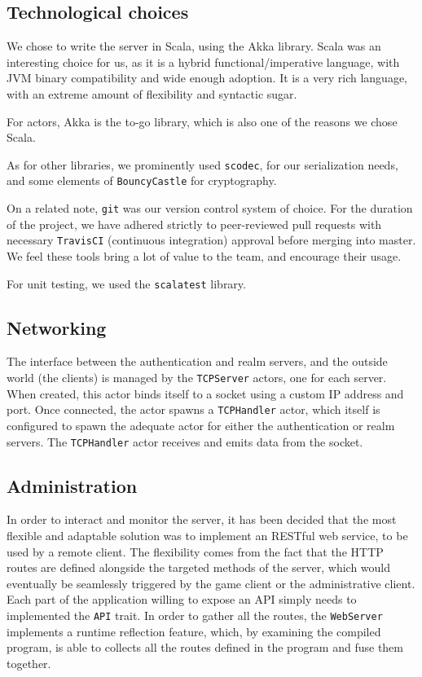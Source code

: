 \documentclass[paper=a4, fontsize=11pt]{scrartcl}
\begin{document}
\subsection{Technological choices}

We chose to write the server in Scala, using the Akka library.
Scala was an interesting choice for us, as it is a hybrid functional/imperative
language, with JVM binary compatibility and wide enough adoption.
It is a very rich language, with an extreme amount of flexibility and syntactic
sugar.

For actors, Akka is the to-go library, which is also one of the reasons we chose
Scala.

As for other libraries, we prominently used \texttt{scodec}, for our
serialization needs, and some elements of \texttt{BouncyCastle} for
cryptography.

On a related note, \texttt{git} was our version control system of choice.
For the duration of the project, we have adhered strictly to peer-reviewed pull
requests with necessary \texttt{TravisCI} (continuous integration) approval
before merging into master.
We feel these tools bring a lot of value to the team, and encourage their usage.

For unit testing, we used the \texttt{scalatest} library.

\subsection{Networking}

The interface between the authentication and realm servers, and the outside
world (the clients) is managed by the \texttt{TCPServer} actors, one for each
server. 
When created, this actor binds itself to a socket using a custom IP address and
port.
Once connected, the actor spawns a \texttt{TCPHandler} actor, which itself is
configured to spawn the adequate actor for either the authentication or realm
servers.
The \texttt{TCPHandler} actor receives and emits data from the socket.


\subsection{Administration}

In order to interact and monitor the server, it has been decided that the most
flexible and adaptable solution was to implement an RESTful web service, to be
used by a remote client.
The flexibility comes from the fact that the HTTP routes are defined alongside
the targeted methods of the server, which would eventually be seamlessly
triggered by the game client or the administrative client.
Each part of the application willing to expose an API simply needs to
implemented the \texttt{API} trait.
In order to gather all the routes, the \texttt{WebServer} implements a
runtime reflection feature, which, by examining the compiled program, is able to
collects all the routes defined in the program and fuse them together.
\end{document}
